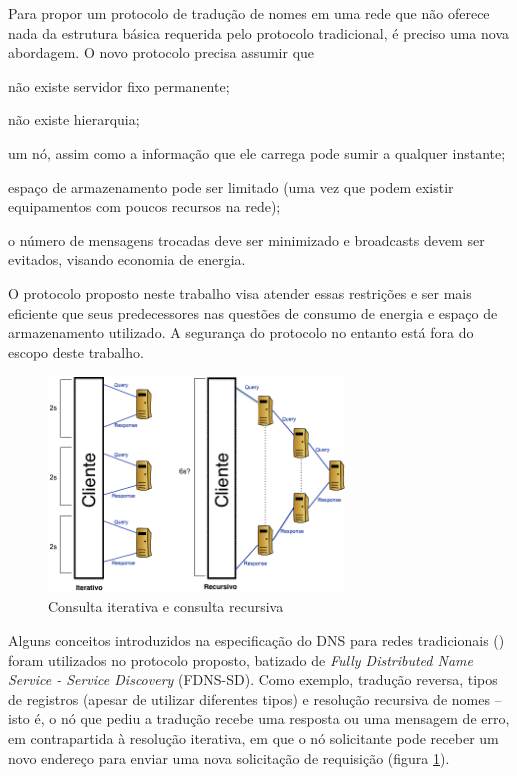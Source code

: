 Para propor um protocolo de tradução de nomes em uma rede que não oferece nada
da estrutura básica requerida pelo protocolo tradicional, é preciso uma nova
abordagem. O novo protocolo precisa assumir que
\begin{inparaenum}[(i)]
    \item não existe servidor fixo permanente;
    \item não existe hierarquia;
    \item um nó, assim como a informação que ele carrega pode sumir a qualquer
    instante;
    \item espaço de armazenamento pode ser limitado (uma vez que podem existir
    equipamentos com poucos recursos na rede);
    \item o número de mensagens trocadas deve ser minimizado e broadcasts devem
    ser evitados, visando economia de energia.
\end{inparaenum}

O protocolo proposto neste trabalho visa atender essas restrições e ser mais
eficiente que seus predecessores \cite{mcdns} \cite{dnssd} \cite{mdns} nas questões
de consumo de energia e espaço de armazenamento utilizado. A segurança do protocolo
no entanto está fora do escopo deste trabalho.

\begin{figure}[h!]
    \centering
    \includegraphics[width=0.7\textwidth]{figures/datagram-timing}
    \caption{Consulta iterativa e consulta recursiva}
    \label{consultas}
\end{figure}

Alguns conceitos introduzidos na especificação do DNS para redes tradicionais
(\cite{rfc1035}) foram utilizados no protocolo proposto, batizado de \textit{Fully
Distributed Name Service - Service Discovery} (FDNS-SD). Como exemplo, tradução
reversa, tipos de registros (apesar de utilizar diferentes tipos) e resolução
recursiva de nomes -- isto é, o nó que pediu a tradução recebe uma resposta ou uma
mensagem de erro, em contrapartida à resolução iterativa, em que o nó solicitante
pode receber um novo endereço para enviar uma nova solicitação de requisição
(figura \ref{consultas}).

